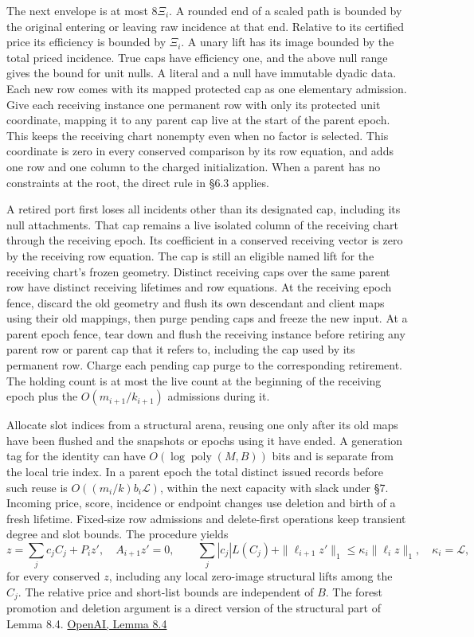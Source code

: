 \documentclass[11pt]{article}
\begin{document}
The next envelope is at most \(8\Xi_i\). A rounded end of a scaled path is bounded by the original entering or leaving raw incidence at that end. Relative to its certified price its efficiency is bounded by \(\Xi_i\). A unary lift has its image bounded by the total priced incidence. True caps have efficiency one, and the above null range gives the bound for unit nulls. A literal and a null have immutable dyadic data. Each new row comes with its mapped protected cap as one elementary admission. Give each receiving instance one permanent row with only its protected unit coordinate, mapping it to any parent cap live at the start of the parent epoch. This keeps the receiving chart nonempty even when no factor is selected. This coordinate is zero in every conserved comparison by its row equation, and adds one row and one column to the charged initialization. When a parent has no constraints at the root, the direct rule in §6.3 applies.

A retired port first loses all incidents other than its designated cap, including its null attachments. That cap remains a live isolated column of the receiving chart through the receiving epoch. Its coefficient in a conserved receiving vector is zero by the receiving row equation. The cap is still an eligible named lift for the receiving chart's frozen geometry. Distinct receiving caps over the same parent row have distinct receiving lifetimes and row equations. At the receiving epoch fence, discard the old geometry and flush its own descendant and client maps using their old mappings, then purge pending caps and freeze the new input. At a parent epoch fence, tear down and flush the receiving instance before retiring any parent row or parent cap that it refers to, including the cap used by its permanent row. Charge each pending cap purge to the corresponding retirement. The holding count is at most the live count at the beginning of the receiving epoch plus the \(O(m_{i+1}/k_{i+1})\) admissions during it.

Allocate slot indices from a structural arena, reusing one only after its old maps have been flushed and the snapshots or epochs using it have ended. A generation tag for the identity can have \(O(\log\operatorname{poly}(M,B))\) bits and is separate from the local trie index. In a parent epoch the total distinct issued records before such reuse is \(O((m_i/k)b_i\mathcal L)\), within the next capacity with slack under §7. Incoming price, score, incidence or endpoint changes use deletion and birth of a fresh lifetime. Fixed-size row admissions and delete-first operations keep transient degree and slot bounds. The procedure yields
\[
 z=\sum_j c_j C_j+P_i z',\quad A_{i+1}z'=0,\qquad
 \sum_j |c_j|L(C_j)+\|\ell_{i+1}z'\|_1\le \kappa_i\|\ell_i z\|_1,\quad
 \kappa_i=\mathcal L ,
\tag{10}
\]
for every conserved \(z\), including any local zero-image structural lifts among the \(C_j\). The relative price and short-list bounds are independent of \(B\). The forest promotion and deletion argument is a direct version of the structural part of Lemma 8.4. \href{https://raw.githubusercontent.com/openai/math/adc7f1241b42e322a6451854ab7e4b4c146bf78a/preprints/Almost-Linear-Time-Maximum-Cardinality-Matching-in-Sparse-General-Graphs-September-24-2026/main.pdf\#page=67}{OpenAI, Lemma 8.4}
\end{document}
